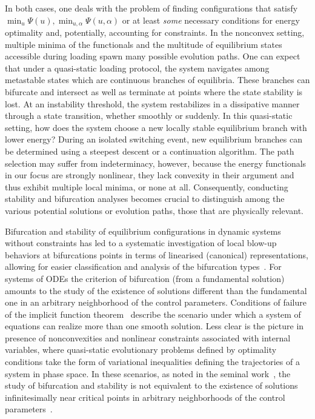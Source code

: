 In both cases, one deals with the problem of finding  configurations that satisfy
$\min_{{u}} \Psi({u}), \min_{{u},\alpha} \Psi({u},\alpha)$
or at least \emph{some} necessary conditions for energy optimality and, potentially, accounting for constraints.
In the nonconvex setting, multiple minima of the functionals and the multitude of equilibrium states accessible during loading spawn many possible evolution paths. One can expect that under a quasi-static loading protocol, the system navigates among metastable states which are continuous branches of equilibria. These branches can bifurcate and intersect as well as terminate at points where the state stability is lost.
At an instability threshold, the system restabilizes in a dissipative manner through a state transition, whether smoothly or suddenly.
In this quasi-static setting, how does the system choose a new locally stable equilibrium branch with lower energy?
During an isolated switching event, new equilibrium branches can be determined using a steepest descent or a continuation algorithm. The path selection may suffer from indeterminacy, however, because the energy functionals in our focus are strongly nonlinear, they lack convexity in their argument and thus exhibit multiple local minima, or none at all.
Consequently, conducting stability and bifurcation analyses becomes crucial to distinguish among the various potential solutions or evolution paths, those that are physically relevant.

Bifurcation and stability of equilibrium configurations in dynamic systems without constraints has led to a systematic investigation of local blow-up behaviors at bifurcations points in terms of linearised (canonical) representations, allowing for easier classification and analysis of the bifurcation types~\cite{Iooss2012-el}.
For systems of ODEs the criterion  of bifurcation (from a fundamental solution) amounts to the study of the existence of solutions different than the fundamental one in an arbitrary neighborhood of the control parameters. Conditions of failure of the implicit function theorem~\cite{Iooss2012-el} describe the scenario under which a system of equations can realize more than one smooth solution.
Less clear is the picture in presence of nonconvexities and nonlinear constraints associated with internal variables, where quasi-static evolutionary problems defined by optimality conditions take the form of variational inequalities defining the trajectories of a system in phase space. In these scenarios, as noted in the seminal work~\cite{Hill1958-xd}, the study of bifurcation and stability is not equivalent to the existence of solutions infinitesimally near critical points in arbitrary neighborhoods of the control parameters~\cite{Bazant2010-zb}.

